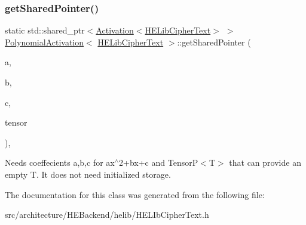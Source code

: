 \subsubsection{\texorpdfstring{get\+Shared\+Pointer()}{getSharedPointer()}}
{\footnotesize\ttfamily static std\+::shared\+\_\+ptr$<$\hyperlink{classActivation}{Activation}$<$\hyperlink{classHELibCipherText}{H\+E\+Lib\+Cipher\+Text}$>$ $>$ \hyperlink{classPolynomialActivation}{Polynomial\+Activation}$<$ \hyperlink{classHELibCipherText}{H\+E\+Lib\+Cipher\+Text} $>$\+::get\+Shared\+Pointer (\begin{DoxyParamCaption}\item[{float}]{a,  }\item[{float}]{b,  }\item[{float}]{c,  }\item[{TensorP$<$ \hyperlink{classHELibCipherText}{H\+E\+Lib\+Cipher\+Text} $>$}]{tensor }\end{DoxyParamCaption})\hspace{0.3cm}{\ttfamily [inline]}, {\ttfamily [static]}}

Needs coeffecients a,b,c for ax$^\wedge$2+bx+c and Tensor\+P$<$\+T$>$ that can provide an empty T. It does not need initialized storage. 

The documentation for this class was generated from the following file\+:\begin{DoxyCompactItemize}
\item 
src/architecture/\+H\+E\+Backend/helib/H\+E\+L\+Ib\+Cipher\+Text.\+h\end{DoxyCompactItemize}

